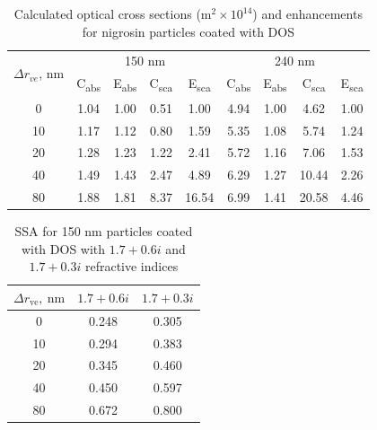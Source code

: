 \documentclass[12pt]{article}
\begin{document}
\begin{table}[!h]
\centering
\caption{Calculated optical cross sections ($\mathrm{m}^2\times10^{14}$) and enhancements for nigrosin particles coated with DOS}
\begin{tabular}{c c c c c c c c c}
    \hline
     \multirow{2}{*}{$\Delta r_{ve}$, nm} &  \multicolumn{4}{c}{150 nm} & \multicolumn{4}{c}{240 nm}\\
     & C\textsubscript{abs} & E\textsubscript{abs} & C\textsubscript{sca} & E\textsubscript{sca} & C\textsubscript{abs} & E\textsubscript{abs} & C\textsubscript{sca} & E\textsubscript{sca} \\
     \hline
     0 & 1.04 & 1.00 & 0.51 & 1.00 & 4.94 & 1.00 & 4.62 & 1.00 \\
     10 & 1.17 & 1.12 & 0.80 & 1.59 & 5.35 & 1.08 & 5.74 & 1.24 \\
     20 & 1.28 & 1.23 & 1.22 & 2.41 & 5.72 & 1.16 & 7.06 & 1.53 \\
     40 & 1.49 & 1.43 & 2.47 & 4.89 & 6.29 & 1.27 & 10.44 & 2.26 \\
     80 & 1.88 & 1.81 & 8.37 & 16.54 & 6.99 & 1.41 & 20.58 & 4.46 \\
     \hline
\end{tabular}
\label{tab:enhancements}
\end{table}

\begin{table}[!h]
    \centering
    \caption{SSA for 150 nm particles coated with DOS with $1.7+0.6i$ and $1.7+0.3i$ refractive indices}
    \begin{tabular}{c c c}
        \hline
        $\Delta r_{\mathrm{ve}},\ \mathrm{nm}$ & $1.7+0.6i$ & $1.7+0.3i$ \\
        \hline
        0 & 0.248 & 0.305 \\
        10 & 0.294 & 0.383 \\
        20 & 0.345 & 0.460 \\
        40 & 0.450 & 0.597 \\
        80 & 0.672 & 0.800 \\
        \hline
    \end{tabular}
    \label{tab:ssa}
\end{table}
\end{document}
